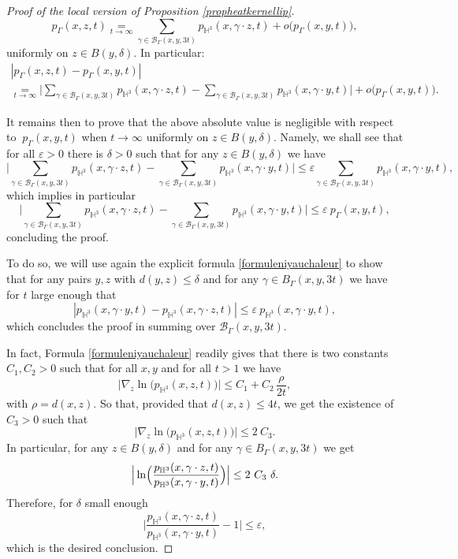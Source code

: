 \documentclass[JEP,XML,SOM,Unicode,NoFloatCountersInSection,published]{cedram}
\let\mathcal\mathscr
\let\epsilon\varepsilon
\theoremstyle{plain}
\theoremstyle{definition}
\newcommand{\HH}{\mathbb{H}}
\newcommand{\somme}[1]{\sum_{#1}}
\begin{document}
\begin{proof}[Proof of the local version of Proposition \ref{propheatkernellip}]
\[
p_{\Gamma}(x,z,t) \underset{t \to \infty} = \somme{ \gamma \in \mathcal{B}_{\Gamma}(x,y,3t) } p_{\HH^3}(x, \gamma \cdot z,t) + o \bigl(p_{\Gamma}(x,y,t) \bigr),
\]
uniformly on $z \in B(y,\delta)$. In particular:
\begin{multline*}
| p_{\Gamma}(x,z,t) - p_{\Gamma}(x,y,t) |\\
\underset{t \to \infty}{=}\biggl| \somme{ \gamma \in \mathcal{B}_{\Gamma}(x,y,3t) } p_{\HH^3}(x, \gamma \cdot z,t) - \somme{ \gamma \in \mathcal{B}_{\Gamma}(x,y,3t) } p_{\HH^3}(x, \gamma \cdot y,t) \biggr| + o \bigl(p_{\Gamma}(x,y,t) \bigr).
\end{multline*}

It remains then to prove that the above absolute value is negligible with respect to $\ p_{\Gamma}(x,y,t)$ when $t \to \infty$ uniformly on $z \in B(y,\delta)$. Namely, we shall see that for all $\epsilon > 0$ there is $\delta > 0$ such that for any $z \in B(y, \delta)$ we have
\[
\biggl| \somme{ \gamma \in \mathcal{B}_{\Gamma}(x,y,3t) } p_{\HH^3}(x, \gamma \cdot z,t) - \somme{ \gamma \in \mathcal{B}_{\Gamma}(x,y,3t) } p_{\HH^3}(x, \gamma \cdot y,t) \biggr| \le \epsilon \somme{ \gamma \in \mathcal{B}_{\Gamma}(x,y,3t) } p_{\HH^3}(x, \gamma \cdot y,t),
\]
which implies in particular
\[
\biggl| \somme{ \gamma \in \mathcal{B}_{\Gamma}(x,y,3t) } p_{\HH^3}(x, \gamma \cdot z,t) - \somme{ \gamma \in \mathcal{B}_{\Gamma}(x,y,3t) } p_{\HH^3}(x, \gamma \cdot y,t) \biggr| \le \epsilon \ p_{\Gamma}(x,y,t),
\]
concluding the proof.

To do so, we will use again the explicit formula \ref{formuleniyauchaleur} to show that for any pairs $y,z$ with $d(y,z) \le \delta$ and for any $\gamma \in B_{\Gamma}(x,y,3t)$ we have for $t$ large enough that
\[
| p_{\HH^3}(x, \gamma \cdot y,t) - p_{\HH^3}(x, \gamma \cdot z,t) | \le \epsilon \ p_{\HH^3}(x, \gamma \cdot y,t),
\]
which concludes the proof in summing over $\mathcal{B}_{\Gamma}(x,y,3t)$.

In fact, Formula \eqref{formuleniyauchaleur} readily gives that there is two constants $C_1, C_2 > 0$ such that for all $x,y$ and for all $t > 1$ we have
\[
\Big| \nabla_z \ln \Big(p_{\HH^3}(x,z,t) \Big) \Big| \le C_1 + C_2 \, \frac{\rho}{2t},
\]
with $\rho = d(x,z)$. So that, provided that $d(x,z) \le 4t$, we get the existence of $C_3 > 0$ such that
\[
\Big| \nabla_z \ln \bigl(p_{\HH^3}(x,z,t) \bigr) \Big| \le 2 \ C_3.
\]
In particular, for any $z \in B(y, \delta)$ and for any $\gamma \in B_{\Gamma}(x,y,3t)$ we get
\[
\Big| \ln \Bigl(\frac{p_{\HH^3}(x,\gamma \cdot z,t)}{p_{\HH^3}(x,\gamma \cdot y,t)} \Bigr) \Big| \le 2 \ C_3 \ \delta.
\]
Therefore, for $\delta$ small enough
\[
\Big| \frac{p_{\HH^3}(x,\gamma \cdot z,t)}{p_{\HH^3}(x,\gamma \cdot y,t)} - 1 \Big| \le \epsilon,
\]
which is the desired conclusion.
\end{proof}
\end{document}
